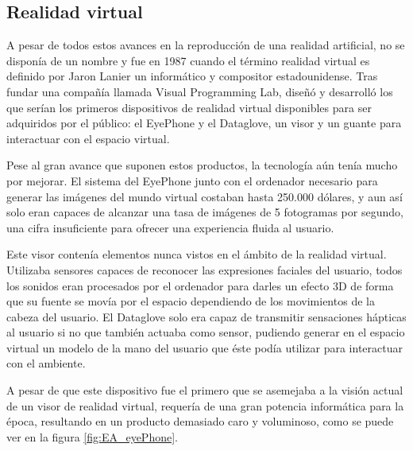 \subsection{Realidad virtual}

A pesar de todos estos avances en la reproducción de una realidad artificial, no se disponía de un nombre y fue en 1987 cuando el término realidad virtual es definido por Jaron Lanier un informático y compositor estadounidense. Tras fundar una compañía llamada Visual Programming Lab, diseñó y desarrolló los que serían los primeros dispositivos de realidad virtual disponibles para ser adquiridos por el público: el EyePhone y el Dataglove, un visor y un guante para interactuar con el espacio virtual.

Pese al gran avance que suponen estos productos, la tecnología aún tenía mucho por mejorar. El sistema del EyePhone junto con el ordenador necesario para generar las imágenes del mundo virtual costaban hasta 250.000 dólares, y aun así solo eran capaces de alcanzar una tasa de imágenes de 5 fotogramas por segundo, una cifra insuficiente para ofrecer una experiencia fluida al usuario.

Este visor contenía elementos nunca vistos en el ámbito de la realidad virtual. Utilizaba sensores capaces de reconocer las expresiones faciales del usuario, todos los sonidos eran procesados por el ordenador para darles un efecto 3D de forma que su fuente se movía por el espacio dependiendo de los movimientos de la cabeza del usuario. El Dataglove solo era capaz de transmitir sensaciones hápticas al usuario si no que también actuaba como sensor, pudiendo generar en el espacio virtual un modelo de la mano del usuario que éste podía utilizar para interactuar con el ambiente.

A pesar de que este dispositivo fue el primero que se asemejaba a la visión actual de un visor de realidad virtual, requería de una gran potencia informática para la época, resultando en un producto demasiado caro y voluminoso, como se puede ver en la figura \ref{fig:EA_eyePhone}.





